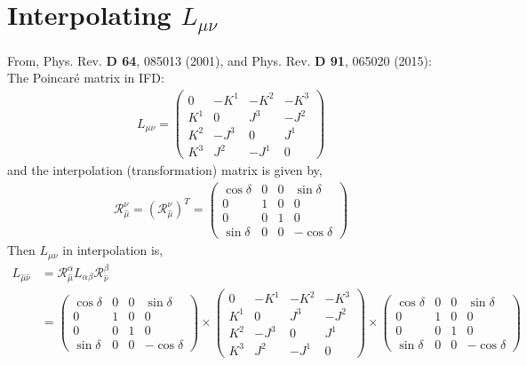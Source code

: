 \documentclass[]{article}
\numberwithin{equation}{section}
\begin{document}
{{  
  
 \section{Interpolating $L_{\mu\nu}$}
 From, Phys. Rev. \textbf{D 64}, 085013 (2001), and Phys. Rev. \textbf{D 91}, 065020 (2015):
 The Poincaré matrix in IFD:
 \begin{align}
     L_{\mu\nu}=\begin{pmatrix}
     0&-K^1&-K^2&-K^3\\
     K^1&0&J^3&-J^2\\
     K^2&-J^3&0&J^1\\
     K^3&J^2&-J^1&0
     \end{pmatrix}
 \end{align}
and the interpolation (transformation) matrix is given by,
\begin{align}
    \mathcal{R}_{\hat{\mu}}^{\nu}=(\mathcal{R}_{\hat{\mu}}^{\nu})^T=\begin{pmatrix}
    \cos{\delta}&0&0&\sin{\delta}\\
    0&1&0&0\\
    0&0&1&0\\
    \sin{\delta}&0&0&-\cos{\delta}
    \end{pmatrix}
\end{align}
Then $L_{\mu\nu}$ in interpolation is,
\begin{align}
    L_{\hat{\mu}\hat{\nu}}&=\mathcal{R}_{\hat{\mu}}^{{\alpha}}L_{\alpha\beta}\mathcal{R}_{\hat{\nu}}^{{\beta}}\\
    &=\begin{pmatrix}
    \cos{\delta}&0&0&\sin{\delta}\\
    0&1&0&0\\
    0&0&1&0\\
    \sin{\delta}&0&0&-\cos{\delta}
    \end{pmatrix}\times\begin{pmatrix}
     0&-K^1&-K^2&-K^3\\
     K^1&0&J^3&-J^2\\
     K^2&-J^3&0&J^1\\
     K^3&J^2&-J^1&0
     \end{pmatrix}\times\begin{pmatrix}
    \cos{\delta}&0&0&\sin{\delta}\\
    0&1&0&0\\
    0&0&1&0\\
    \sin{\delta}&0&0&-\cos{\delta}
    \end{pmatrix}\\

\end{align}}}
\end{document}
